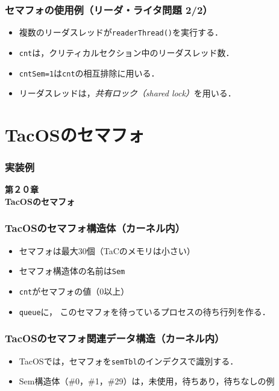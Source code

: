 \documentclass[unicode,handout]{beamer}                   %
\begin{document}
\begin{frame}
  \frametitle{セマフォの使用例（リーダ・ライタ問題 2/2）}
  \begin{itemize}
  \item 複数のリーダスレッドが\texttt{readerThread()}を実行する．
  \item \texttt{cnt}は，クリティカルセクション中のリーダスレッド数．
  \item \texttt{cntSem=1}は\texttt{cnt}の相互排除に用いる．
  \item リーダスレッドは，\emph{共有ロック（shared lock）}を用いる．
  \end{itemize}
  \vfill
\end{frame}

\section{TacOSのセマフォ}
\begin{frame}
  \frametitle{実装例}
  \vfill
  \begin{center}
    \textbf{\LARGE 第２０章} \\
    \textbf{\Huge TacOSのセマフォ}\\
    \vfill
  \end{center}
  \vfill
\end{frame}

\begin{frame}
  \frametitle{TacOSのセマフォ構造体（カーネル内）}
  \vfill
  \begin{itemize}
    \item セマフォは最大30個（TaCのメモリは小さい）
    \item セマフォ構造体の名前は{\tt Sem}
    \item {\tt cnt}がセマフォの値（0以上）
    \item {\tt queue}に，
      このセマフォを待っているプロセスの待ち行列を作る．
  \end{itemize}
  \vfill
\end{frame}

\begin{frame}
  \frametitle{TacOSのセマフォ関連データ構造（カーネル内）}
  \begin{itemize}
    \item TacOSでは，セマフォを{\tt semTbl}のインデクスで識別する．
    \item Sem構造体（\#0，\#1，\#29）は，未使用，待ちあり，待ちなしの例
  \end{itemize}
  \vfill
\end{frame}
\end{document}
